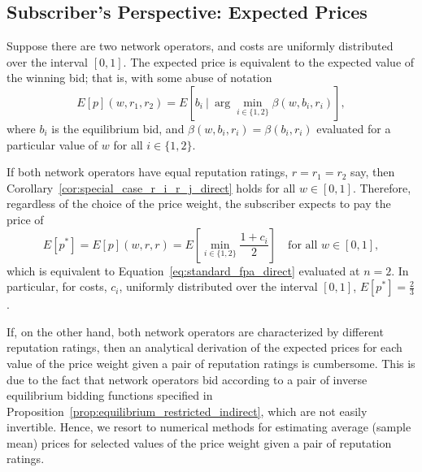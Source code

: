 \subsection{Subscriber's Perspective: Expected Prices} %
\label{sub:subscriber_s_perspective_expected_prices_indirect}
Suppose there are two network operators, and costs are uniformly distributed over the interval $[0,1]$. The expected price is equivalent to the expected value of the winning bid; that is, with some abuse of notation
\begin{equation}
  \label{eq:exp_price_def_indirect}
  E[p](w,r_1,r_2) = E[b_i \:\vert\: \arg\min_{i\in \{1,2\}}\beta(w,b_i,r_i)],
\end{equation}
where $b_i$ is the equilibrium bid, and $\beta(w,b_i,r_i) = \beta(b_i,r_i)$ evaluated for a particular value of $w$ for all $i\in \{1,2\}$.

If both network operators have equal reputation ratings, $r = r_1 = r_2$ say, then Corollary~\ref{cor:special_case_r_i_r_j_direct} holds for all $w\in [0,1]$. Therefore, regardless of the choice of the price weight, the subscriber expects to pay the price of
\begin{equation}
  \label{eq:exp_price_at_w_1_indirect}
  E[p^*] = E[p](w,r,r) = E\left[\min_{i\in \{1,2\}}\frac{1+c_i}{2}\right] \quad\textrm{for all } w\in [0,1],
\end{equation}
which is equivalent to Equation~\eqref{eq:standard_fpa_direct} evaluated at $n=2$. In particular, for costs, $c_i$, uniformly distributed over the interval $[0,1]$, $E[p^*] = \frac{2}{3}$.

If, on the other hand, both network operators are characterized by different reputation ratings, then an analytical derivation of the expected prices for each value of the price weight given a pair of reputation ratings is cumbersome. This is due to the fact that network operators bid according to a pair of inverse equilibrium bidding functions specified in Proposition~\ref{prop:equilibrium_restricted_indirect}, which are not easily invertible. Hence, we resort to numerical methods for estimating average (sample mean) prices for selected values of the price weight given a pair of reputation ratings.

